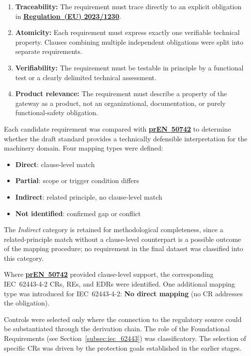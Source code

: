 \begin{enumerate}
	\item \textbf{Traceability:} The requirement must trace directly to an explicit obligation in \hyperref[subsec:eu_machinery_regulation]{\textbf{Regulation~(EU) 2023/1230}}.
	\item \textbf{Atomicity:} Each requirement must express exactly one verifiable technical property. Clauses combining multiple independent obligations were split into separate requirements.
	\item \textbf{Verifiability:} The requirement must be testable in principle by a functional test or a clearly delimited technical assessment.
	\item \textbf{Product relevance:} The requirement must describe a property of the gateway as a product, not an organizational, documentation, or purely functional-safety obligation.
\end{enumerate}



Each candidate requirement was compared with \hyperref[subsec:pren_50742]{\textbf{prEN~50742}} to determine whether the draft standard provides a technically defensible interpretation for the machinery domain. Four mapping types were defined: 
\begin{itemize}
	\item \textbf{Direct}: clause-level match
	\item \textbf{Partial}: scope or trigger condition differs 
	\item \textbf{Indirect}: related principle, no clause-level match
	\item \textbf{Not identified}: confirmed gap or conflict
\end{itemize}

The \emph{Indirect} category is retained for methodological completeness, since a related-principle match without a clause-level counterpart is a possible outcome of the mapping procedure; no requirement in the final dataset was classified into this category.

Where \hyperref[subsec:pren_50742]{\textbf{prEN~50742}} provided clause-level support, the corresponding IEC~62443-4-2 CRs, REs, and EDRs were identified. One additional mapping type was introduced for IEC~62443-4-2: \textbf{No direct mapping} (no CR addresses the obligation).

Controls were selected only where the connection to the regulatory source could be substantiated through the derivation chain. The role of the Foundational Requirements (see Section~\ref{subsec:iec_62443}) was classificatory. The selection of specific CRs was driven by the protection goals established in the earlier stages.

